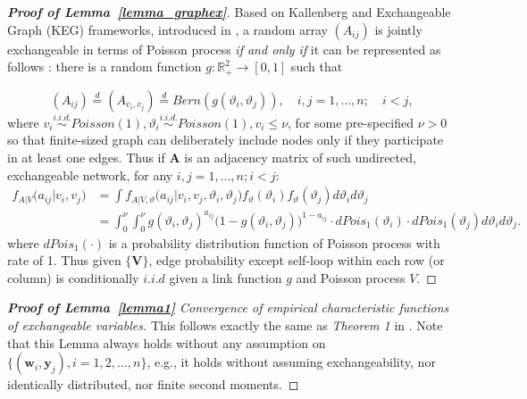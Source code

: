 \documentclass[12pt]{article}
\theoremstyle{definition}
\begin{document}
\begin{proof}[\textbf{Proof of Lemma~\ref{lemma_graphex}}]
	Based on Kallenberg and Exchangeable Graph (KEG) frameworks, introduced in \cite{veitch2015class}, a random array $(A_{ij})$ is jointly exchangeable in terms of Poisson process \textit{if and only if} it can be represented as follows : there is a random function $g : \mathbb{R}^{2}_{+} \rightarrow [0,1]$ such that 
	
	\begin{equation}
	(A_{ij})  \stackrel{d}{=} (A_{v_{i}, v_{j}} )  \stackrel{d}{=} Bern( g( \vartheta_{i}, \vartheta_{j})), \quad i,j=1,\ldots,n ;\quad i < j,
	\end{equation}
	where $v_{i} \overset{i.i.d.}{\sim} Poisson(1), \vartheta_{i} \overset{i.i.d.}{\sim} Poisson(1), v_{i} \leq \nu$, for some pre-specified $\nu >0$ so that finite-sized graph can deliberately include nodes only if they participate in at least one edges. Thus if $\mathbf{A}$ is an adjacency matrix of such undirected, exchangeable network, for any $i,j = 1,... , n; i < j$:
\begin{equation}
\begin{split}
	f_{A | V} \big( a_{ij} \big| v_{i}, v_{j} \big) & = \int f_{A | V, \vartheta} \big( a_{ij} \big| v_{i}, v_{j}, \vartheta_{i}, \vartheta_{j} \big) f_{\vartheta} ( \vartheta_{i}) f_{\vartheta}(\vartheta_{j})   d\vartheta_{i} d\vartheta_{j}   \\ & = \int_{0}^{\nu} \int_{0}^{\nu}   g( \vartheta_{i},  \vartheta_{j})^{a_{ij}} \big( 1- g( \vartheta_{i},  \vartheta_{j}) \big)^{1-a_{ij}}  \cdot dPois_{1}(\vartheta_{i}) \cdot dPois_{1}(\vartheta_{j})  d \vartheta_{i} d \vartheta_{j}.
\end{split}
\end{equation}
where $dPois_{1}(\cdot)$ is a probability distribution function of Poisson process with rate of 1.  Thus given $\{ \mathbf{V} \}$, edge probability except self-loop within each row (or column) is conditionally $\textit{i.i.d}$ given a link function $g$ and Poisson process $V$.
\end{proof}
\begin{proof}[\textbf{Proof of Lemma~\ref{lemma1}} Convergence of empirical characteristic functions of exchangeable variables] 
	
This follows exactly the same as \textit{Theorem 1} in \cite{szekely2007measuring}. Note that this Lemma always holds without any assumption on $\{(\mathbf{w}_{i},\mathbf{y}_{j}), i=1,2,...,n\}$, e.g., it holds without assuming exchangeability, nor identically distributed, nor finite second moments.
\end{proof}
\end{document}
